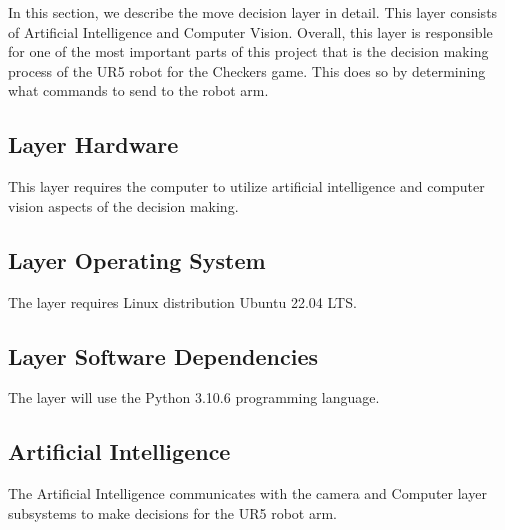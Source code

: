  In this section, we describe the move decision layer in detail. This layer consists of Artificial Intelligence and Computer Vision. Overall, this layer is responsible for one of the most important parts of this project that is the decision making process of the UR5 robot for the Checkers game. This does so by determining what commands to send to the robot arm.

\subsection{Layer Hardware}
This layer requires the computer to utilize artificial intelligence and computer vision aspects of the decision making.

\subsection{Layer Operating System}
The layer requires Linux distribution Ubuntu 22.04 LTS.

\subsection{Layer Software Dependencies}
The layer will use the Python 3.10.6 programming language. 

\subsection{Artificial Intelligence}
The Artificial Intelligence communicates with the camera and Computer layer subsystems to make decisions for the UR5 robot arm.

